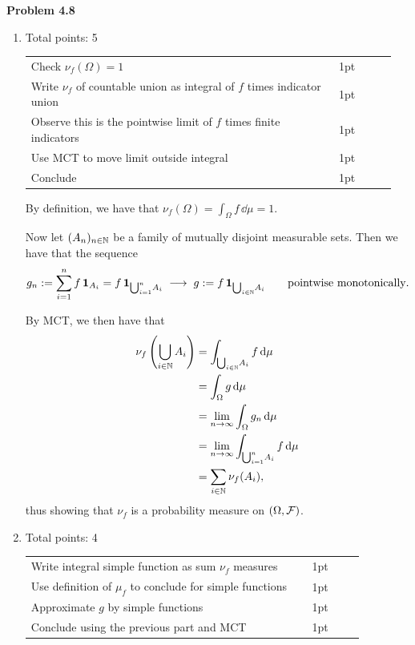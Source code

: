 \documentclass{lecturenotes}
\newcommand{\rubric}[1]{#1}
\begin{document}
\textbf{Problem 4.8}

\begin{enumerate}[label={(\alph*)}]
	\item \rubric{ Total points: 5 \hfill
		
		\begin{tabular}{p{0.8\linewidth}p{0.15\linewidth}}
		\hline
		Check $\nu_f(\Omega) = 1$ & 1pt\\
		Write $\nu_f$ of countable union as integral of $f$ times indicator union & 1pt\\
		Observe this is the pointwise limit of $f$ times finite indicators & 1pt\\
		Use MCT to move limit outside integral & 1pt\\
		Conclude & 1pt\\
		\hline
		\end{tabular}
		
		} 
		
	By definition, we have that $\nu_f(\Omega) = \int_\Omega f\,\dd\mu = 1$. 
	
	Now let $(A_n)_{n\in\mathbb N}$ be a family of mutually disjoint measurable sets. Then we have that the sequence 
	\[
		g_n:= \sum_{i=1}^n f\,\mathbf{1}_{A_i} = f\,\mathbf{1}_{\bigcup_{i=1}^n\! A_i}\;\longrightarrow\; g:= f\,\mathbf{1}_{\bigcup_{i\in\mathbb N}\! A_i}\qquad\text{pointwise monotonically}.
	\]
	
	By MCT, we then have that
	\begin{align*}
		\nu_f\left(\bigcup_{i\in\mathbb N} A_i\right) &= \int_{\bigcup_{i\in\mathbb N}\! A_i} f\,\mathrm{d}\mu \\
		&= \int_\Omega g \, \mathrm{d} \mu \\
		&= \lim_{n\to\infty} \int_\Omega g_n \,\mathrm{d} \mu \\
		&= \lim_{n\to\infty} \int_{\bigcup_{i=1}^n\! A_i} f\,\mathrm{d}\mu \\
		&=  \sum_{i\in\mathbb N}\nu_f(A_i),
	\end{align*}
	thus showing that $\nu_f$ is a probability measure on $(\Omega,\mathcal F)$.
	
	\item \rubric{ Total points: 4 \hfill
		
		\begin{tabular}{p{0.8\linewidth}p{0.15\linewidth}}
		\hline
		Write integral simple function as sum $\nu_f$ measures & 1pt\\
		Use definition of $\mu_f$ to conclude for simple functions & 1pt\\
		Approximate $g$ by simple functions & 1pt\\
		Conclude using the previous part and MCT & 1pt\\
		\hline
		\end{tabular}
		
}
\end{enumerate}
\end{document}
